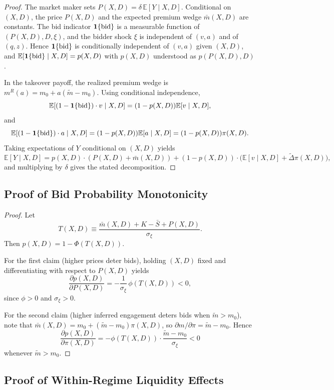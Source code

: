 \documentclass[11pt]{article}
\newcommand{\E}{\mathbb{E}}
\newcommand{\1}{\mathbf{1}}
\begin{document}
\begin{proof}
    The market maker sets $P(X,D)=\delta\,\E[Y \mid X,D]$. Conditional on $(X,D)$, the price $P(X,D)$ and the expected premium wedge $\bar{m}(X,D)$ are constants. The bid indicator $\1\{\textup{bid}\}$ is a measurable function of $(P(X,D),D,\xi)$, and the bidder shock $\xi$ is independent of $(v,a)$ and of $(q,z)$. Hence $\1\{\textup{bid}\}$ is conditionally independent of $(v,a)$ given $(X,D)$, and $\E[\1\{\textup{bid}\} \mid X,D]=p(X,D)$ with $p(X,D)$ understood as $p(P(X,D),D)$.

  In the takeover payoff, the realized premium wedge is $m^{R}(a)=m_0+a(\tilde{m}-m_0)$. Using conditional independence,
\[
\E[(1-\1\{\textup{bid}\})\cdot v \mid X,D] = (1-p(X,D))\E[v \mid X,D],
\]
and
\[
\E[(1-\1\{\textup{bid}\})\cdot a \mid X,D] = (1-p(X,D))\E[a \mid X,D] = (1-p(X,D))\pi(X,D).
\]
  Taking expectations of $Y$ conditional on $(X,D)$ yields
  \[
  \E[Y \mid X,D]
  =p(X,D)\cdot(P(X,D)+\bar{m}(X,D))+(1-p(X,D))\cdot\big(\E[v \mid X,D]+\tilde{\Delta}\pi(X,D)\big),
  \]
  and multiplying by $\delta$ gives the stated decomposition.
\end{proof}

\subsection{Proof of Bid Probability Monotonicity}
\label{app:proof-bid-monotone}

\begin{proof}
Let
\[
T(X,D)\equiv \frac{\bar{m}(X,D)+K-\bar{S}+P(X,D)}{\sigma_\xi}.
\]
Then $p(X,D)=1-\Phi(T(X,D))$.

  For the first claim (higher prices deter bids), holding $(X,D)$ fixed and differentiating with respect to $P(X,D)$ yields
  \[
  \frac{\partial p(X,D)}{\partial P(X,D)}=-\frac{1}{\sigma_\xi}\,\phi(T(X,D))<0,
  \]
  since $\phi>0$ and $\sigma_\xi>0$.
  
  For the second claim (higher inferred engagement deters bids when $\tilde m>m_0$), note that $\bar{m}(X,D)=m_0+(\tilde{m}-m_0)\pi(X,D)$, so $\partial m/\partial \pi=\tilde{m}-m_0$. Hence
  \[
  \frac{\partial p(X,D)}{\partial \pi(X,D)}=-\phi(T(X,D))\cdot \frac{\tilde{m}-m_0}{\sigma_\xi}<0
  \]
  whenever $\tilde{m}>m_0$.
\end{proof}

\subsection{Proof of Within-Regime Liquidity Effects}
\label{app:proof-cs-liquidity-within}
\end{document}
